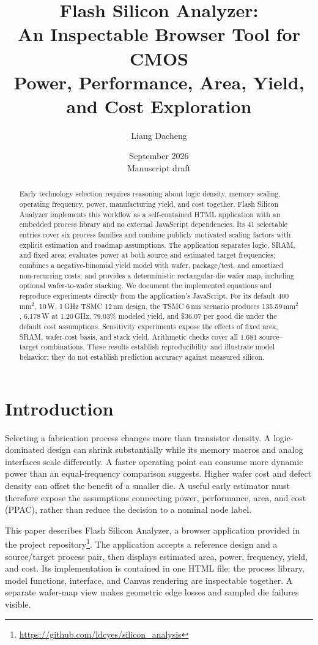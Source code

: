 \documentclass[11pt,a4paper]{article}
\title{\textbf{Flash Silicon Analyzer:\\
An Inspectable Browser Tool for CMOS\\
Power, Performance, Area, Yield, and Cost Exploration}}
\author{Liang Dacheng}
\date{September 2026\\[3pt]\small Manuscript draft}
\newcommand{\tool}{Flash Silicon Analyzer}
\begin{document}
\maketitle

\begin{abstract}
Early technology selection requires reasoning about logic density, memory
scaling, operating frequency, power, manufacturing yield, and cost together.
\tool{} implements this workflow as a self-contained HTML
application with an embedded process library and no external JavaScript
dependencies. Its 41 selectable entries cover six process families and combine
publicly motivated scaling factors with explicit estimation and roadmap
assumptions. The application separates logic, SRAM, and fixed area; evaluates
power at both source and estimated target frequencies; combines a
negative-binomial yield model with wafer, package/test, and amortized
non-recurring costs; and provides a deterministic rectangular-die wafer map,
including optional wafer-to-wafer stacking. We document the implemented
equations and reproduce experiments directly from the application's
JavaScript. For its default 400\,mm$^2$, 10\,W, 1\,GHz TSMC 12\,nm design,
the TSMC 6\,nm scenario produces 135.59\,mm$^2$, 6.178\,W at 1.20\,GHz,
79.03\% modeled yield, and \$36.07 per good die under the default cost
assumptions. Sensitivity experiments expose the effects of fixed area, SRAM,
wafer-cost basis, and stack yield. Arithmetic checks cover all 1,681
source--target combinations. These results establish reproducibility and
illustrate model behavior; they do not establish prediction accuracy against
measured silicon.
\end{abstract}

\section{Introduction}
Selecting a fabrication process changes more than transistor density. A
logic-dominated design can shrink substantially while its memory macros and
analog interfaces scale differently. A faster operating point can consume
more dynamic power than an equal-frequency comparison suggests. Higher wafer
cost and defect density can offset the benefit of a smaller die. A useful
early estimator must therefore expose the assumptions connecting power,
performance, area, and cost (PPAC), rather than reduce the decision to a
nominal node label.

This paper describes \tool{}, a browser application provided in the project
repository\footnote{\url{https://github.com/ldcyes/silicon_analysis}}.
The application accepts a reference design and a
source/target process pair, then displays estimated area, power, frequency,
yield, and cost. Its implementation is contained in one HTML file: the process
library, model functions, interface, and Canvas rendering are inspectable
together. A separate wafer-map view makes geometric edge losses and sampled
die failures visible.
\end{document}
